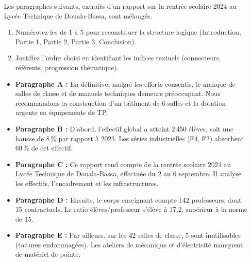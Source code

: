 \documentclass[11pt]{article}
\newcounter{popsec}
\newcounter{popsub}
\newcommand{\courssub}[1]{%
  \stepcounter{popsub}%
  \par\vspace{9pt}\noindent{\popxbold\fontsize{11.5}{13}\selectfont\color{popink}{\color{poporange}\thepopsec.\thepopsub}\hspace{6pt}#1}\par\nopagebreak\vspace{4pt}
}
\begin{document}
\begin{exercice}
Les paragraphes suivants, extraits d'un rapport sur la rentrée scolaire 2024 au Lycée Technique de Douala-Bassa, sont mélangés.
\begin{enumerate}
    \item Numérotez-les de 1 à 5 pour reconstituer la structure logique (Introduction, Partie 1, Partie 2, Partie 3, Conclusion).
    \item Justifiez l'ordre choisi en identifiant les indices textuels (connecteurs, référents, progression thématique).
\end{enumerate}
\begin{itemize}
    \item[$\square$] \textbf{Paragraphe A :} En définitive, malgré les efforts consentis, le manque de salles de classe et de manuels techniques demeure préoccupant. Nous recommandons la construction d'un bâtiment de 6 salles et la dotation urgente en équipements de TP.
    \item[$\square$] \textbf{Paragraphe B :} D'abord, l'effectif global a atteint 2\,450 élèves, soit une hausse de 8\,\% par rapport à 2023. Les séries industrielles (F4, F2) absorbent 60\,\% de cet effectif.
    \item[$\square$] \textbf{Paragraphe C :} Ce rapport rend compte de la rentrée scolaire 2024 au Lycée Technique de Douala-Bassa, effectuée du 2 au 6 septembre. Il analyse les effectifs, l'encadrement et les infrastructures.
    \item[$\square$] \textbf{Paragraphe D :} Ensuite, le corps enseignant compte 142 professeurs, dont 15 contractuels. Le ratio élèves/professeur s'élève à 17,2, supérieur à la norme de 15.
    \item[$\square$] \textbf{Paragraphe E :} Par ailleurs, sur les 42 salles de classe, 5 sont inutilisables (toitures endommagées). Les ateliers de mécanique et d'électricité manquent de matériel de pointe.
\end{itemize}
\end{exercice}

\courssub{Je me prépare au Bac}
\end{document}
